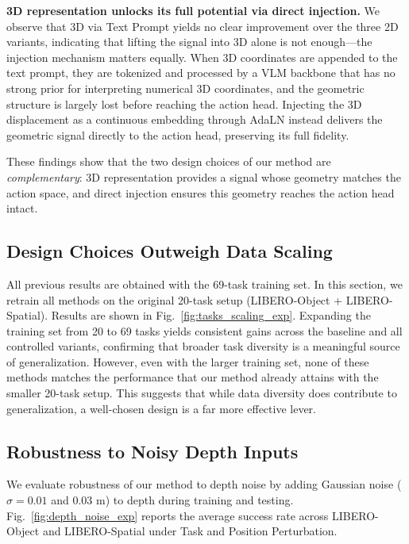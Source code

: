 \textbf{3D representation unlocks its full potential via direct injection.} We observe that 3D via Text Prompt yields no clear improvement over the three 2D variants, indicating that lifting the signal into 3D alone is not enough—the injection mechanism matters equally. When 3D coordinates are appended to the text prompt, they are tokenized and processed by a VLM backbone that has no strong prior for interpreting numerical 3D coordinates, and the geometric structure is largely lost before reaching the action head. Injecting the 3D displacement as a continuous embedding through AdaLN instead delivers the geometric signal directly to the action head, preserving its full fidelity. 

These findings show that the two design choices of our method are \emph{complementary}: 3D representation provides a signal whose geometry matches the action space, and direct injection ensures this geometry reaches the action head intact.

\subsection{Design Choices Outweigh Data Scaling}
\label{sec:tasks_scaling}


All previous results are obtained with the 69-task training set. In this section, we retrain all methods on the original 20-task setup (LIBERO-Object + LIBERO-Spatial). Results are shown in Fig.~\ref{fig:tasks_scaling_exp}. Expanding the training set from 20 to 69 tasks yields consistent gains across the baseline and all controlled variants, confirming that broader task diversity is a meaningful source of generalization. However, even with the larger training set, none of these methods matches the performance that our method already attains with the smaller 20-task setup. This suggests that while data diversity does contribute to generalization, a well-chosen design is a far more effective lever.

\subsection{Robustness to Noisy Depth Inputs}
\label{sec:depth_noise_exp}
We evaluate robustness of our method to depth noise by adding Gaussian noise ($\sigma = 0.01$ and $0.03$ m) to depth during training and testing. Fig.~\ref{fig:depth_noise_exp} reports the average success rate across LIBERO-Object and LIBERO-Spatial under Task and Position Perturbation.

